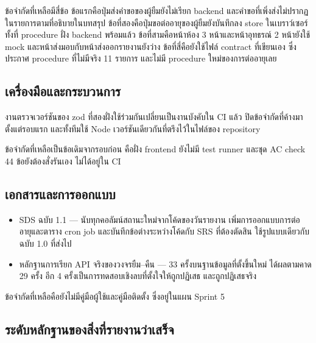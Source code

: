 ข้อจำกัดที่เหลือมีสี่ข้อ ข้อแรกคือปุ่มส่งคำขอของผู้ยืมยังไม่เรียก backend และคำขอที่เพิ่งส่งไม่ปรากฏในรายการตามที่อธิบายในบทสรุป ข้อที่สองคือปุ่มขอต่ออายุของผู้ยืมยังบันทึกลง store ในเบราว์เซอร์ ทั้งที่ procedure ฝั่ง backend พร้อมแล้ว ข้อที่สามคือหน้าห้อง 3 หน้าและหน้าอุทธรณ์ 2 หน้ายังใช้ mock และหน้าส่งมอบกับหน้าส่งออกรายงานยังว่าง ข้อที่สี่คือยังใช้ไฟล์ contract ที่เขียนเอง ซึ่งประกาศ procedure ที่ไม่มีจริง 11 รายการ และไม่มี procedure ใหม่ของการต่ออายุเลย

\subsection{เครื่องมือและกระบวนการ}

งานตรวจเวอร์ชันของ zod ที่สองฝั่งใช้ร่วมกันเปลี่ยนเป็นงานบังคับใน CI แล้ว ปิดข้อจำกัดที่ค้างมาตั้งแต่รอบแรก และทั้งทีมใช้ Node เวอร์ชันเดียวกันที่ตรึงไว้ในไฟล์ของ repository

ข้อจำกัดที่เหลือเป็นข้อเดิมจากรอบก่อน คือฝั่ง frontend ยังไม่มี test runner และชุด AC check 44 ข้อยังต้องสั่งรันเอง ไม่ได้อยู่ใน CI

\subsection{เอกสารและการออกแบบ}

\begin{itemize}
 \item SDS ฉบับ 1.1 — นับทุกคอลัมน์สถานะใหม่จากโค้ดของวันรายงาน เพิ่มการออกแบบการต่ออายุและตาราง cron job และบันทึกข้อต่างระหว่างโค้ดกับ SRS ที่ต้องตัดสิน ใช้รูปแบบเดียวกับฉบับ 1.0 ที่ส่งไป
 \item หลักฐานการเรียก API จริงของวงจรยืม–คืน — 33 ครั้งบนฐานข้อมูลที่ตั้งขึ้นใหม่ ได้ผลตามคาด 29 ครั้ง อีก 4 ครั้งเป็นการทดสอบเชิงลบที่ตั้งใจให้ถูกปฏิเสธ และถูกปฏิเสธจริง
\end{itemize}

ข้อจำกัดที่เหลือคือยังไม่มีคู่มือผู้ใช้และคู่มือติดตั้ง ซึ่งอยู่ในแผน Sprint 5

\subsection{ระดับหลักฐานของสิ่งที่รายงานว่าเสร็จ}

